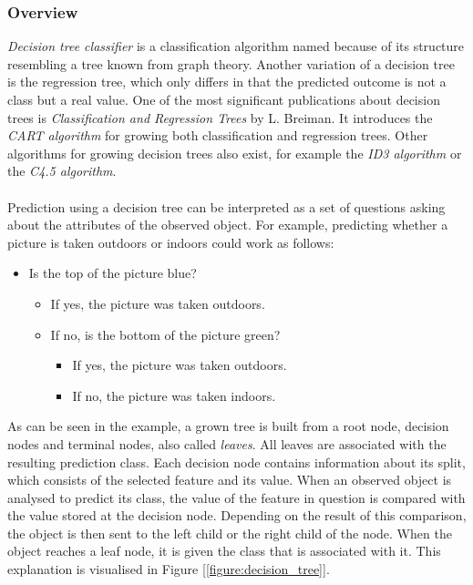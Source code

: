 \documentclass[11pt]{article}
\begin{document}
      \subsubsection{Overview}
        {\it Decision tree classifier} is a classification algorithm named because of its structure resembling a tree known from graph theory. Another variation of a decision tree is the regression tree, which only differs in that the predicted outcome is not a class but a real value. One of the most significant publications about decision trees is {\it Classification and Regression Trees} by L. Breiman. It introduces the {\it CART algorithm} for growing both classification and regression trees. \cite{cart} Other algorithms for growing decision trees also exist, for example the {\it ID3 algorithm} or the {\it C4.5 algorithm}.
        \\~\\
        Prediction using a decision tree can be interpreted as a set of questions asking about the attributes of the observed object. For example, predicting whether a picture is taken outdoors or indoors could work as follows:
        \begin{itemize}
          \item Is the top of the picture blue?
          \begin{itemize}
            \item If yes, the picture was taken outdoors.
            \item If no, is the bottom of the picture green?
            \begin{itemize}
              \item If yes, the picture was taken outdoors.
              \item If no, the picture was taken indoors.
            \end{itemize}
          \end{itemize}
        \end{itemize}
        As can be seen in the example, a grown tree is built from a root node, decision nodes and terminal nodes, also called {\it leaves}. All leaves are associated with the resulting prediction class. Each decision node contains information about its split, which consists of the selected feature and its value. When an observed object is analysed to predict its class, the value of the feature in question is compared with the value stored at the decision node. Depending on the result of this comparison, the object is then sent to the left child or the right child of the node. When the object reaches a leaf node, it is given the class that is associated with it. This explanation is visualised in Figure [\ref{figure:decision_tree}].
\end{document}
